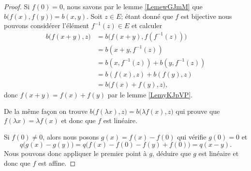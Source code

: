 \begin{proof}
    Si \( f(0)=0\), nous savons par le lemme \ref{LemewGJmM} que \( b\big( f(x),f(y) \big)=b(x,y)\). Soit \( z\in E\); étant donné que \( f\) est bijective nous pouvons considérer l'élément \( f^{-1}(z)\in E\) et calculer
    \begin{subequations}
        \begin{align}
            b\big( f(x+y),z \big)&=b\big( f(x+y),f(f^{-1}(z)) \big)\\
            &=b(x+y,f^{-1}(z))\\
            &=b(x,f^{-1}(z))+b(y,f^{-1}(z))\\
            &=b(f(x),z)+b(f(y),z)\\
            &=b\big( f(x)+f(y),z \big),
        \end{align}
    \end{subequations}
    donc \( f(x+y)=f(x)+f(y)\) par le lemme \ref{LemyKJpVP}. 

    De la même façon on trouve \( b\big( f(\lambda x),z \big)=b\big( \lambda f(x),z \big)\) qui prouve que \( f(\lambda x)=\lambda f(x)\) et donc que \( f\) est linéaire.

    Si \( f(0)\neq 0\), alors nous posons \( g(x)=f(x)-f(0)\) qui vérifie \( g(0)=0\) et
    \begin{equation}
        q\big( g(x)-g(y) \big)=q\big( f(x)-f(0)-f(y)+f(0) \big)=q(x-y).
    \end{equation}
    Nous pouvons donc appliquer le premier point à \( g\), déduire que \( g\) est linéaire et donc que \( f\) est affine.
\end{proof}


